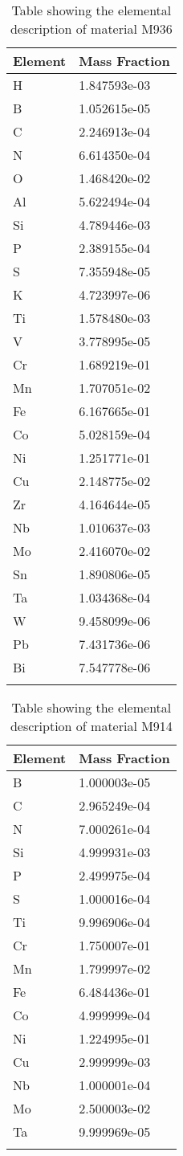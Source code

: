 \begin{centering}
\begin{longtable}[ht!]
{ p{} | p{} }
\hline
Element & Mass Fraction\\
\hline
H &  1.847593e-03\\
B &  1.052615e-05\\
C &  2.246913e-04\\
N &  6.614350e-04\\
O &  1.468420e-02\\
Al &  5.622494e-04\\
Si &  4.789446e-03\\
P &  2.389155e-04\\
S &  7.355948e-05\\
K &  4.723997e-06\\
Ti &  1.578480e-03\\
V &  3.778995e-05\\
Cr &  1.689219e-01\\
Mn &  1.707051e-02\\
Fe &  6.167665e-01\\
Co &  5.028159e-04\\
Ni &  1.251771e-01\\
Cu &  2.148775e-02\\
Zr &  4.164644e-05\\
Nb &  1.010637e-03\\
Mo &  2.416070e-02\\
Sn &  1.890806e-05\\
Ta &  1.034368e-04\\
W &  9.458099e-06\\
Pb &  7.431736e-06\\
Bi &  7.547778e-06\\
\caption{Table showing the elemental description of material M936}
\label{table:material_ShieldBlock}
\end{longtable}
\clearpage

\begin{longtable}[ht!]
{ p{} | p{} }
\hline
Element & Mass Fraction\\
\hline
B &  1.000003e-05\\
C &  2.965249e-04\\
N &  7.000261e-04\\
Si &  4.999931e-03\\
P &  2.499975e-04\\
S &  1.000016e-04\\
Ti &  9.996906e-04\\
Cr &  1.750007e-01\\
Mn &  1.799997e-02\\
Fe &  6.484436e-01\\
Co &  4.999999e-04\\
Ni &  1.224995e-01\\
Cu &  2.999999e-03\\
Nb &  1.000001e-04\\
Mo &  2.500003e-02\\
Ta &  9.999969e-05\\
\caption{Table showing the elemental description of material M914}
\label{table:material_UppDucts}
\end{longtable}
\clearpage


\end{centering}
